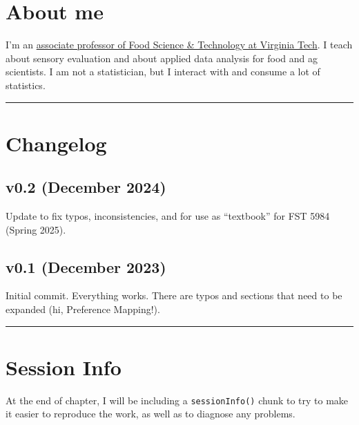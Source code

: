 \documentclass[
]{book}
\begin{document}
\section*{About me}\label{about-me}

I'm an \href{https://www.fst.vt.edu/aboutus/faculty/jlahne.html}{associate professor of Food Science \& Technology at Virginia Tech}. I teach about sensory evaluation and about applied data analysis for food and ag scientists. I am not a statistician, but I interact with and consume a lot of statistics.

\begin{center}\rule{0.5\linewidth}{0.5pt}\end{center}

\section*{Changelog}\label{changelog}

\subsection*{v0.2 (December 2024)}\label{v0.2-december-2024}

Update to fix typos, inconsistencies, and for use as ``textbook'' for FST 5984 (Spring 2025).

\subsection*{v0.1 (December 2023)}\label{v0.1-december-2023}

Initial commit. Everything works. There are typos and sections that need to be expanded (hi, Preference Mapping!).

\begin{center}\rule{0.5\linewidth}{0.5pt}\end{center}

\section*{Session Info}\label{session-info}

At the end of chapter, I will be including a \texttt{sessionInfo()} chunk to try to make it easier to reproduce the work, as well as to diagnose any problems.
\end{document}
